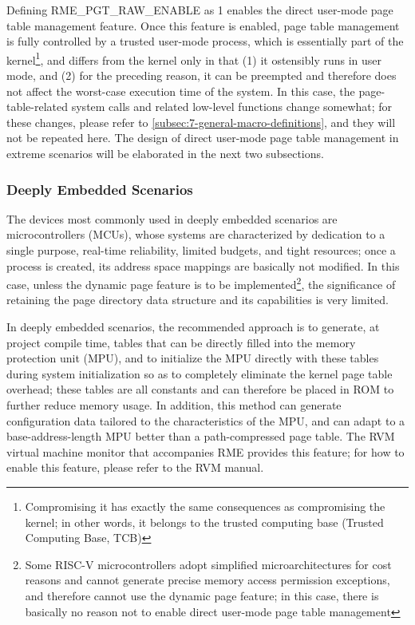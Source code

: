 Defining RME\_PGT\_RAW\_ENABLE as 1 enables the direct user-mode page table management feature. Once this feature is enabled, page table management is fully controlled by a trusted user-mode process, which is essentially part of the kernel\footnote{Compromising it has exactly the same consequences as compromising the kernel; in other words, it belongs to the trusted computing base (Trusted
  Computing Base, TCB)}, and differs from the kernel only in that (1) it ostensibly runs in user mode, and (2) for the preceding reason, it can be preempted and therefore does not affect the worst-case execution time of the system. In this case, the page-table-related system calls and related low-level functions change somewhat; for these changes, please refer to \ref{subsec:7-general-macro-definitions},
and they will not be repeated here. The design of direct user-mode page table management in extreme scenarios will be elaborated in the next two subsections.

\subsubsection{Deeply Embedded Scenarios}\label{subsubsec:9-deep-embedded-scenario}

The devices most commonly used in deeply embedded scenarios are microcontrollers (MCUs), whose systems are characterized by dedication to a single purpose, real-time reliability, limited budgets, and tight resources; once a process is created, its address space mappings are basically not modified. In this case, unless the dynamic page feature is to be implemented\footnote{Some RISC-V microcontrollers adopt simplified microarchitectures for cost reasons and cannot generate precise memory access permission exceptions, and therefore cannot use the dynamic page feature; in this case, there is basically no reason not to enable direct user-mode page table management}, the significance of retaining the page directory data structure and its capabilities is very limited.

In deeply embedded scenarios, the recommended approach is to generate, at project compile time, tables that can be directly filled into the memory protection unit (MPU), and to initialize the MPU directly with these tables during system initialization so as to completely eliminate the kernel page table overhead; these tables are all constants and can therefore be placed in ROM to further reduce memory usage. In addition, this method can generate configuration data tailored to the characteristics of the MPU, and can adapt to a base-address-length MPU better than a path-compressed page table. The RVM virtual machine monitor that accompanies RME provides this feature; for how to enable this feature, please refer to the RVM manual.

